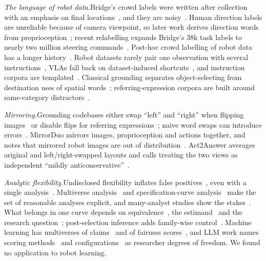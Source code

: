 \documentclass[conference]{IEEEtran}
\newcommand{\head}[1]{\textit{#1}\hspace{0.4em}}
\begin{document}
\head{The language of robot data.}Bridge's crowd labels were written after collection with an emphasis on final locations~\cite{walke2023bridgedata}, and they are noisy~\cite{blank2024scaling}. Human direction labels are unreliable because of camera viewpoint, so later work derives direction words from proprioception~\cite{belkhale2024rth,zawalski2024robotic}; recent relabelling expands Bridge's 38k task labels to nearly two million steering commands~\cite{chen2026steerable}. Post-hoc crowd labelling of robot data has a longer history~\cite{lynch2021language}. Robot datasets rarely pair one observation with several instructions~\cite{glossop2025cast}, VLAs fall back on dataset-induced shortcuts~\cite{fang2026liberocf,xing2025shortcut}, and instruction corpora are templated~\cite{wanna2026limited}. Classical grounding separates object-selecting from destination uses of spatial words~\cite{tellex2011understanding,hatori2018interactively,venkatesh2021spatial}; referring-expression corpora are built around same-category distractors~\cite{yu2016modeling}.

\head{Mirroring.}Grounding codebases either swap ``left'' and ``right'' when flipping images~\cite{kamath2021mdetr,deng2021transvg,yang2019fast,yang2020improving} or disable flips for referring expressions~\cite{li2021referring}; naive word swaps can introduce errors~\cite{yi2024augment}. MirrorDuo mirrors images, proprioception and actions together, and notes that mirrored robot images are out of distribution~\cite{zhuang2025mirrorduo}. Act2Answer averages original and left/right-swapped layouts and calls treating the two views as independent ``mildly anticonservative''~\cite{kachaev2026act2answer}.

\head{Analytic flexibility.}Undisclosed flexibility inflates false positives~\cite{simmons2011false}, even with a single analysis~\cite{gelman2013garden}. Multiverse analysis~\cite{steegen2016increasing} and specification-curve analysis~\cite{simonsohn2020specification} make the set of reasonable analyses explicit, and many-analyst studies show the stakes~\cite{silberzahn2018many,botviniknezer2020variability,breznau2022observing}. What belongs in one curve depends on equivalence~\cite{delgiudice2021travelers}, the estimand~\cite{lundberg2021what} and the research question~\cite{auspurg2021has}; post-selection inference adds family-wise control~\cite{girardi2024post}. Machine learning has multiverses of claims~\cite{bell2022modeling} and of fairness scores~\cite{simson2024one}, and LLM work names scoring methods~\cite{tsvilodub2024predictions} and configurations~\cite{cummins2025threat} as researcher degrees of freedom. We found no application to robot learning.
\end{document}
